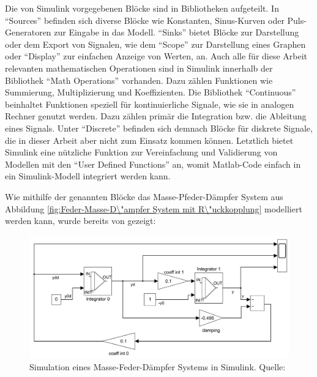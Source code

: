 Die von Simulink vorgegebenen Blöcke sind in Bibliotheken aufgeteilt. In "`Sources"' befinden sich diverse Blöcke wie Konstanten, Sinus-Kurven oder Puls-Generatoren zur Eingabe in das Modell. "`Sinks"' bietet Blöcke zur Darstellung oder dem Export von Signalen, wie dem "`Scope"' zur Darstellung eines Graphen oder "`Display"' zur einfachen Anzeige von Werten, an. Auch alle für diese Arbeit relevanten mathematischen Operationen sind in Simulink innerhalb der Bibliothek "`Math Operations"' vorhanden. Dazu zählen Funktionen wie Summierung, Multiplizierung und Koeffizienten. Die Bibliothek "`Continuous"' beinhaltet Funktionen speziell für kontinuierliche Signale, wie sie in analogen Rechner genutzt werden. Dazu zählen primär die Integration bzw. die Ableitung eines Signals. Unter "`Discrete"' befinden sich demnach Blöcke für diskrete Signale, die in dieser Arbeit aber nicht zum Einsatz kommen können. Letztlich bietet Simulink eine nützliche Funktion zur Vereinfachung und Validierung von Modellen mit den "`User Defined Functions"' an, womit Matlab-Code einfach in ein Simulink-Modell integriert werden kann. \cite[vgl.]{Peasley2018}

Wie mithilfe der genannten Blöcke das Masse-Pfeder-Dämpfer System aus Abbildung \ref{fig:Feder-Masse-D\"ampfer System mit R\"uckkopplung} modelliert werden kann, wurde bereits von \citeauthor{Ulmann2022} gezeigt:

\begin{figure}[h]
  \includegraphics[width=\textwidth]{abbildungen/simulink_beispiel.png}
  \caption{Simulation eines Masse-Feder-Dämpfer Systems in Simulink. Quelle: \cite[S. 241]{Ulmann2022}}
  \label{fig:Masse-Feder-Dämpfer Simulink}
\end{figure}

